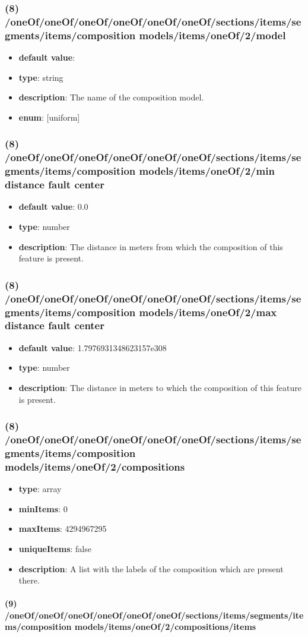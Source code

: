 \subsubsection{(8) /oneOf/oneOf/oneOf/oneOf/oneOf/oneOf/sections/items/segments/items/composition models/items/oneOf/2/model}
\begin{itemize}[leftmargin=8em]\item {\bf default value}: 
\item {\bf type}: string
\item {\bf description}: The name of the composition model.
\item {\bf enum}: [uniform]\end{itemize}\subsubsection{(8) /oneOf/oneOf/oneOf/oneOf/oneOf/oneOf/sections/items/segments/items/composition models/items/oneOf/2/min distance fault center}
\begin{itemize}[leftmargin=8em]\item {\bf default value}: 0.0
\item {\bf type}: number
\item {\bf description}: The distance in meters from which the composition of this feature is present.
\end{itemize}\subsubsection{(8) /oneOf/oneOf/oneOf/oneOf/oneOf/oneOf/sections/items/segments/items/composition models/items/oneOf/2/max distance fault center}
\begin{itemize}[leftmargin=8em]\item {\bf default value}: 1.7976931348623157e308
\item {\bf type}: number
\item {\bf description}: The distance in meters to which the composition of this feature is present.
\end{itemize}\subsubsection{(8) /oneOf/oneOf/oneOf/oneOf/oneOf/oneOf/sections/items/segments/items/composition models/items/oneOf/2/compositions}
\begin{itemize}[leftmargin=8em]\item {\bf type}: array
\item {\bf minItems}: 0
\item {\bf maxItems}: 4294967295
\item {\bf uniqueItems}: false
\item {\bf description}: A list with the labels of the composition which are present there.
\end{itemize}\paragraph{(9) /oneOf/oneOf/oneOf/oneOf/oneOf/oneOf/sections/items/segments/items/composition models/items/oneOf/2/compositions/items}
